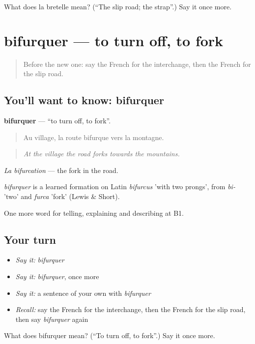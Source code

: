\begin{tcolorbox}[breakable,colback=teal!4,colframe=teal!35!black,title={Before you move on}]
What does la bretelle mean? (\textquotedblleft{}The slip road; the strap\textquotedblright{}.) Say it once more.
\end{tcolorbox}
\section[bifurquer]{bifurquer — to turn off, to fork}

\label{lesson:FR-C400-bifurquer}



\begin{quote}
Before the new one: say the French for the interchange, then the French for the slip road.
\end{quote}

\subsection*{You'll want to know: bifurquer}
\textbf{bifurquer} — \textquotedblleft{}to turn off, to fork\textquotedblright{}.

\begin{quote}
Au village, la route bifurque vers la montagne.
\end{quote}

\begin{quote}
\emph{At the village the road forks towards the mountains.}
\end{quote}

\emph{La bifurcation} — the fork in the road.

\begin{cousinweb}
\emph{bifurquer} is a learned formation on Latin \emph{bifurcus} 'with two prongs', from \emph{bi-} 'two' and \emph{furca} 'fork' (Lewis \& Short).
\end{cousinweb}

\begin{grammarlens}[title={What you've built}]
One more word for telling, explaining and describing at B1.
\end{grammarlens}

\subsection*{Your turn}
\begin{itemize}
\raggedright
  \item \emph{Say it:} \emph{bifurquer}
  \item \emph{Say it:} \emph{bifurquer}, once more
  \item \emph{Say it:} a sentence of your own with \emph{bifurquer}
  \item \emph{Recall:} say the French for the interchange, then the French for the slip road, then say \emph{bifurquer} again
\end{itemize}

\begin{tcolorbox}[breakable,colback=teal!4,colframe=teal!35!black,title={Before you move on}]
What does bifurquer mean? (\textquotedblleft{}To turn off, to fork\textquotedblright{}.) Say it once more.
\end{tcolorbox}
